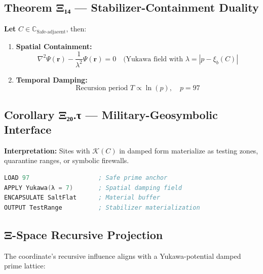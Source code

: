 \documentclass[12]{amsart}
\theoremstyle{plain}
\begin{document}
\subsection{Theorem Ξ₁₄ — Stabilizer-Containment Duality}

\textbf{Let } $C \in \mathbb{C}_{\text{Safe-adjacent}}$, then:

\begin{enumerate}
    \item \textbf{Spatial Containment:}
    \[
    \nabla^2 \Psi(\mathbf{r}) - \frac{1}{\lambda^2} \Psi(\mathbf{r}) = 0 \quad \text{(Yukawa field with } \lambda = |p - \xi_b(C)|
    \]
    \item \textbf{Temporal Damping:}
    \[
    \text{Recursion period } T \propto \ln(p), \quad p = 97
    \]
\end{enumerate}

\subsection{Corollary Ξ₂₀.τ — Military-Geosymbolic Interface}

\textbf{Interpretation:} Sites with $\mathcal{K}(C)$ in damped form materialize as testing zones, quarantine ranges, or symbolic firewalls.

\begin{lstlisting}[language=Assembler, caption=Mythic Assembly Protocol]
LOAD 97                   ; Safe prime anchor
APPLY Yukawa(λ = 7)       ; Spatial damping field
ENCAPSULATE SaltFlat      ; Material buffer
OUTPUT TestRange          ; Stabilizer materialization
\end{lstlisting}

\subsection{Ξ-Space Recursive Projection}

The coordinate's recursive influence aligns with a Yukawa-potential damped prime lattice:

\begin{center}
\end{center}
\end{document}
